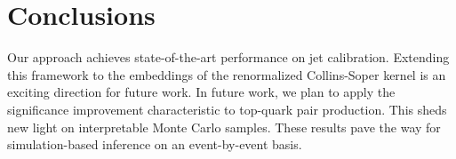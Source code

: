 \section{Conclusions}\label{sec:conclusions}

Our approach achieves state-of-the-art performance on jet calibration.
Extending this framework to the embeddings of the renormalized
Collins-Soper kernel is an exciting direction for future work. In future
work, we plan to apply the significance improvement characteristic to
top-quark pair production. This sheds new light on interpretable Monte
Carlo samples. These results pave the way for simulation-based inference
on an event-by-event basis.

